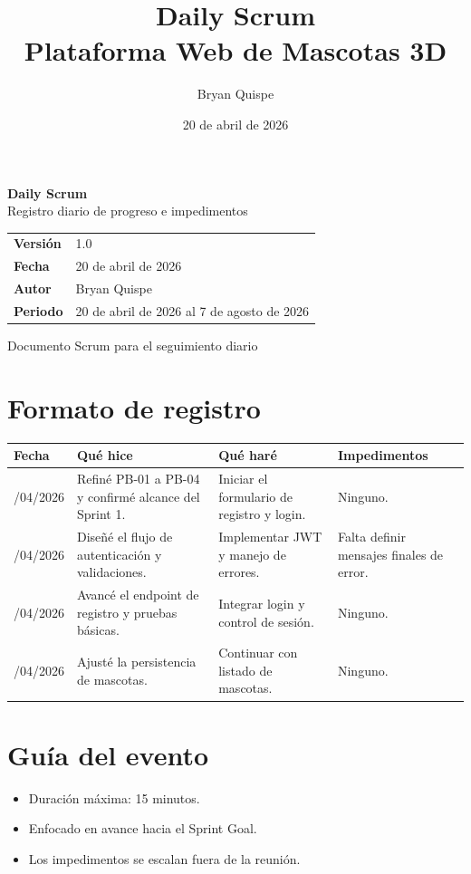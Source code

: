 \documentclass[12pt,a4paper]{article}
\title{\Huge\textbf{Daily Scrum}\\[0.3em]\Large Plataforma Web de Mascotas 3D}
\author{Bryan Quispe}
\date{20 de abril de 2026}
\begin{document}
\begin{titlepage}
\centering
\vspace*{1.8cm}
{\Huge\bfseries\color{PrimaryBlue} Daily Scrum\\[0.35em]}
{\LARGE Registro diario de progreso e impedimentos\\[1.2cm]}

\begin{tabular}{p{5cm} p{8cm}}
\rowcolor{SoftGray}
\textbf{Versión} & 1.0 \\
\textbf{Fecha} & 20 de abril de 2026 \\
\textbf{Autor} & Bryan Quispe \\
\textbf{Periodo} & 20 de abril de 2026 al 7 de agosto de 2026 \\
\end{tabular}

\vfill
{\large Documento Scrum para el seguimiento diario}
\end{titlepage}

\section{Formato de registro}
\begin{longtable}{>{\raggedright\arraybackslash}p{2.2cm} >{\raggedright\arraybackslash}p{5cm} >{\raggedright\arraybackslash}p{5cm} >{\raggedright\arraybackslash}p{3cm}}
\toprule
\textbf{Fecha} & \textbf{Qué hice} & \textbf{Qué haré} & \textbf{Impedimentos} \\
\midrule
20/04/2026 & Refiné PB-01 a PB-04 y confirmé alcance del Sprint 1. & Iniciar el formulario de registro y login. & Ninguno. \\
21/04/2026 & Diseñé el flujo de autenticación y validaciones. & Implementar JWT y manejo de errores. & Falta definir mensajes finales de error. \\
22/04/2026 & Avancé el endpoint de registro y pruebas básicas. & Integrar login y control de sesión. & Ninguno. \\
23/04/2026 & Ajusté la persistencia de mascotas. & Continuar con listado de mascotas. & Ninguno. \\
\bottomrule
\end{longtable}

\section{Guía del evento}
\begin{itemize}[leftmargin=*]
    \item Duración máxima: 15 minutos.
    \item Enfocado en avance hacia el Sprint Goal.
    \item Los impedimentos se escalan fuera de la reunión.
\end{itemize}
\end{document}
